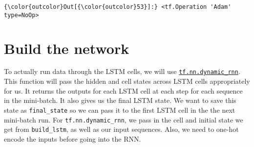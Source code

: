 \documentclass[11pt]{article}
\begin{document}
\begin{Verbatim}[commandchars=\\\{\}]
{\color{outcolor}Out[{\color{outcolor}53}]:} <tf.Operation 'Adam' type=NoOp>
\end{Verbatim}
            
    \section{Build the network}\label{build-the-network}

    To actually run data through the LSTM cells, we will use
\href{https://www.tensorflow.org/versions/r1.0/api_docs/python/tf/nn/dynamic_rnn}{\texttt{tf.nn.dynamic\_rnn}}.
This function will pass the hidden and cell states across LSTM cells
appropriately for us. It returns the outputs for each LSTM cell at each
step for each sequence in the mini-batch. It also gives us the final
LSTM state. We want to save this state as \texttt{final\_state} so we
can pass it to the first LSTM cell in the the next mini-batch run. For
\texttt{tf.nn.dynamic\_rnn}, we pass in the cell and initial state we
get from \texttt{build\_lstm}, as well as our input sequences. Also, we
need to one-hot encode the inputs before going into the RNN.


    
    
    
    
\end{document}
